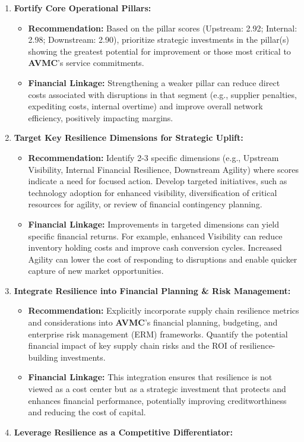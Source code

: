 \documentclass[
  oneside,
  open=any,
  fontsize=11pt]{scrbook}
\providecommand{\tightlist}{%
  \setlength{\itemsep}{0pt}\setlength{\parskip}{0pt}}
\begin{document}
\begin{enumerate}
\def\labelenumi{\arabic{enumi}.}
\tightlist
\item
  \textbf{Fortify Core Operational Pillars:}

  \begin{itemize}
  \tightlist
  \item
    \textbf{Recommendation:} Based on the pillar scores (Upstream: 2.92;
    Internal: 2.98; Downstream: 2.90), prioritize strategic investments
    in the pillar(s) showing the greatest potential for improvement or
    those most critical to \textbf{AVMC}'s service commitments.
  \item
    \textbf{Financial Linkage:} Strengthening a weaker pillar can reduce
    direct costs associated with disruptions in that segment (e.g.,
    supplier penalties, expediting costs, internal overtime) and improve
    overall network efficiency, positively impacting margins.
  \end{itemize}
\item
  \textbf{Target Key Resilience Dimensions for Strategic Uplift:}

  \begin{itemize}
  \tightlist
  \item
    \textbf{Recommendation:} Identify 2-3 specific dimensions (e.g.,
    Upstream Visibility, Internal Financial Resilience, Downstream
    Agility) where scores indicate a need for focused action. Develop
    targeted initiatives, such as technology adoption for enhanced
    visibility, diversification of critical resources for agility, or
    review of financial contingency planning.
  \item
    \textbf{Financial Linkage:} Improvements in targeted dimensions can
    yield specific financial returns. For example, enhanced Visibility
    can reduce inventory holding costs and improve cash conversion
    cycles. Increased Agility can lower the cost of responding to
    disruptions and enable quicker capture of new market opportunities.
  \end{itemize}
\item
  \textbf{Integrate Resilience into Financial Planning \& Risk
  Management:}

  \begin{itemize}
  \tightlist
  \item
    \textbf{Recommendation:} Explicitly incorporate supply chain
    resilience metrics and considerations into \textbf{AVMC}'s financial
    planning, budgeting, and enterprise risk management (ERM)
    frameworks. Quantify the potential financial impact of key supply
    chain risks and the ROI of resilience-building investments.
  \item
    \textbf{Financial Linkage:} This integration ensures that resilience
    is not viewed as a cost center but as a strategic investment that
    protects and enhances financial performance, potentially improving
    creditworthiness and reducing the cost of capital.
  \end{itemize}
\item
  \textbf{Leverage Resilience as a Competitive Differentiator:}


\end{enumerate}
\end{document}
